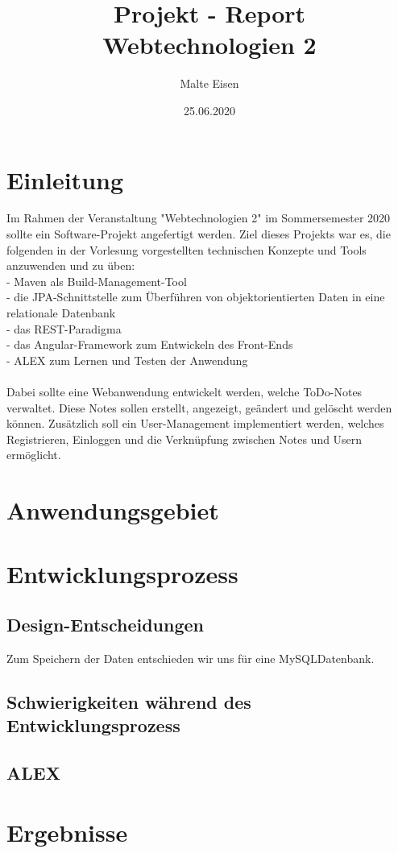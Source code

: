 \documentclass[12pt,titlepage]{article}
\begin{document}
\begin{titlepage}
\title{Projekt - Report \\ Webtechnologien 2}
\date{25.06.2020}
\author{Malte Eisen}
\maketitle
\end{titlepage}

\newpage
\tableofcontents
\newpage

\section{Einleitung}
Im Rahmen der Veranstaltung "Webtechnologien 2" im Sommersemester 2020 sollte ein Software-Projekt angefertigt werden. Ziel dieses Projekts war es, die folgenden in der Vorlesung vorgestellten technischen Konzepte und Tools anzuwenden und zu \"uben:\\
- Maven als Build-Management-Tool\\
- die JPA-Schnittstelle zum \"Uberf\"uhren von objektorientierten Daten in eine relationale Datenbank\\
- das REST-Paradigma\\
- das Angular-Framework zum Entwickeln des Front-Ends\\
- ALEX zum Lernen und Testen der Anwendung\\
\\
Dabei sollte eine Webanwendung entwickelt werden, welche ToDo-Notes verwaltet. Diese Notes sollen erstellt, angezeigt, ge\"andert und gel\"oscht werden k\"onnen. Zus\"atzlich soll ein User-Management implementiert werden, welches Registrieren, Einloggen und die Verkn\"upfung zwischen Notes und Usern erm\"oglicht. 

 
\section{Anwendungsgebiet}

\section{Entwicklungsprozess}

\subsection{Design-Entscheidungen}
Zum Speichern der Daten entschieden wir uns f\"ur eine MySQLDatenbank. 
\subsection{Schwierigkeiten w\"ahrend des Entwicklungsprozess}

\subsection{ALEX}

\section{Ergebnisse}
\end{document}
